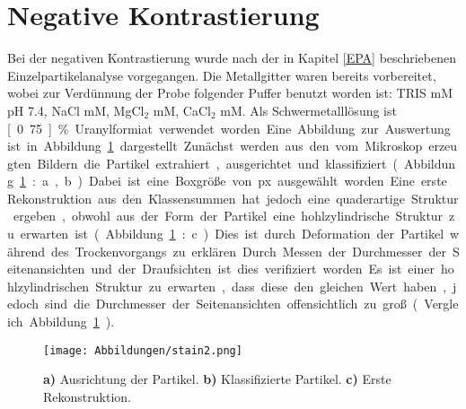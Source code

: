 \section{Negative Kontrastierung} %
\label{sec:negative_kontrastierung}

Bei der negativen Kontrastierung wurde nach der in Kapitel \ref{EPA} beschriebenen Einzelpartikelanalyse vorgegangen.
Die Metallgitter waren bereits vorbereitet, wobei zur Verdünnung der Probe folgender Puffer benutzt worden ist: TRIS \unit[50]{mM} pH 7.4, NaCl \unit[150]{mM}, MgCl$_2$ \unit[5]{mM}, CaCl$_2$ \unit[5]{mM}.
Als Schwermetalllösung ist \unit[0.75]{\%} Uranylformiat verwendet worden.
Eine Abbildung zur Auswertung ist in Abbildung \ref{stain_schema} dargestellt.

Zunächst werden aus den vom Mikroskop erzeugten Bildern die Partikel extrahiert, ausgerichtet und klassifiziert (Abbildung \ref{stain_schema}:a, b).
Dabei ist eine Boxgröße von \unit[140]{px} ausgewählt worden.
Eine erste Rekonstruktion aus den Klassensummen hat jedoch eine quaderartige Struktur ergeben, obwohl aus der Form der Partikel eine hohlzylindrische Struktur zu erwarten ist (Abbildung \ref{stain_schema}:c).
Dies ist durch Deformation der Partikel während des Trockenvorgangs zu erklären.
Durch Messen der Durchmesser der Seitenansichten und der Draufsichten ist dies verifiziert worden.
Es ist einer hohlzylindrischen Struktur zu erwarten, dass diese den gleichen Wert haben, jedoch sind die Durchmesser der Seitenansichten offensichtlich zu groß (Vergleich Abbildung \ref{stain_schema}).

\begin{figure}
	\texttt{[image: Abbildungen/stain2.png]}
	\caption[Negativ: Weg zur ersten Rekonstruktion]{\textbf{a)} Ausrichtung der Partikel. \textbf{b)} Klassifizierte Partikel. \textbf{c)} Erste Rekonstruktion.}
	\label{stain_schema}
\end{figure}



\FloatBarrier